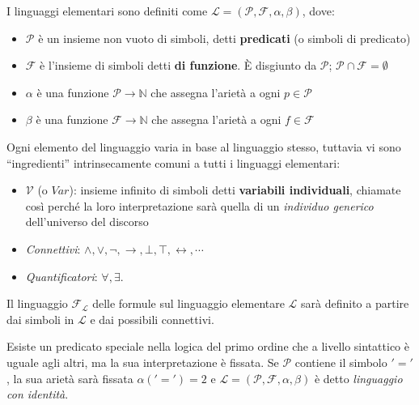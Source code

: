 \begin{defi}
I linguaggi elementari sono definiti come $\mathscr{L} = (\mathscr{P}, \mathscr{F}, \alpha, \beta)$,  dove:
\begin{itemize}
 \item $\mathscr{P}$ è un insieme non vuoto di simboli, detti \textbf{predicati} (o simboli di predicato)
 \item $\mathscr{F}$ è l'insieme di simboli detti \textbf{di funzione}. È disgiunto da $\mathscr{P}$; $\mathscr{P} \cap \mathscr{F} = \emptyset$
 \item $\alpha$ è una funzione $\mathscr{P} \rightarrow \mathbb{N}$ che assegna l'arietà a ogni $p \in \mathscr{P}$
 \item $\beta$ è una funzione $\mathscr{F} \rightarrow \mathbb{N}$ che assegna l'arietà a ogni $f \in \mathscr{F}$
\end{itemize}
\end{defi}

Ogni elemento del linguaggio varia in base al linguaggio stesso, tuttavia vi sono ``ingredienti'' intrinsecamente comuni a tutti i linguaggi elementari:
\begin{itemize}
  \item $\mathscr{V}$ (o $Var$): insieme infinito di simboli detti \textbf{variabili individuali}, chiamate così perché la loro interpretazione sarà quella di un \textit{individuo generico} dell'universo del discorso
  \item \textit{Connettivi}: $\land, \lor, \neg, \rightarrow, \bot, \top, \leftrightarrow, \cdots$
  \item \textit{Quantificatori}: $\forall, \exists$.
\end{itemize} 

Il linguaggio $\mathscr{F}_\mathscr{L}$ delle formule sul linguaggio elementare $\mathscr{L}$ sarà definito 
a partire dai simboli in $\mathscr{L}$ e dai possibili connettivi. 

\begin{oss}
        Esiste un predicato speciale nella logica del primo ordine che a livello sintattico è uguale agli altri, ma la sua interpretazione è fissata. Se $\mathscr{P}$ contiene il simbolo $'='$, la sua arietà sarà fissata $\alpha('=') = 2$ e $\mathscr{L} = (\mathscr{P}, \mathscr{F}, \alpha, \beta)$ è detto \textit{linguaggio con identità}.
\end{oss}

